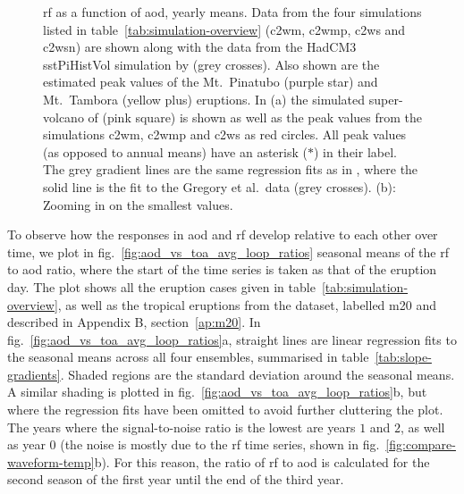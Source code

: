 \documentclass{ametsocV6.1}
\begin{document}
\begin{figure}
  \caption{\gls{rf} as a function of \gls{aod}, yearly means. Data from the four
    simulations listed in table~\ref{tab:simulation-overview} (\gls{c2wm}, \gls{c2wmp},
    \gls{c2ws} and \gls{c2wsn}) are shown along with the data from the HadCM3 sstPiHistVol
    simulation by \citet{gregory2016} (grey crosses). Also shown are the estimated peak
    values of the Mt.\ Pinatubo (purple star) and Mt.\ Tambora (yellow plus) eruptions. In
    (a) the simulated super-volcano of \citet{jones2005} (pink square) is shown as well as
    the peak values from the simulations \gls{c2wm}, \gls{c2wmp} and \gls{c2ws} as red
    circles. All peak values (as opposed to annual means) have an asterisk (\(\ast{}\)) in
    their label. The grey gradient lines are the same regression fits as in \citet[][Fig.\
      4]{gregory2016}, where the solid line is the fit to the Gregory et al.\ data (grey
    crosses). (b): Zooming in on the smallest values.}\label{fig:aod_vs_toa_ses_avg}%
\end{figure}

To observe how the responses in \gls{aod} and \gls{rf} develop relative to each other
over time, we plot in fig.~\ref{fig:aod_vs_toa_avg_loop_ratios} seasonal means of the
\gls{rf} to \gls{aod} ratio, where the start of the time series is taken as that of the
eruption day. The plot shows all the eruption cases given in
table~\ref{tab:simulation-overview}, as well as the tropical eruptions from the
\citet{marshall2020dataset} dataset, labelled \gls{m20} and described in Appendix B,
section~\ref{ap:m20}. In fig.~\ref{fig:aod_vs_toa_avg_loop_ratios}a, straight lines are
linear regression fits to the seasonal means across all four ensembles, summarised in
table~\ref{tab:slope-gradients}. Shaded regions are the standard deviation around the
seasonal means. A similar shading is plotted in
fig.~\ref{fig:aod_vs_toa_avg_loop_ratios}b, but where the regression fits have been
omitted to avoid further cluttering the plot. The years where the signal-to-noise ratio
is the lowest are years \(1\) and \(2\), as well as year \(0\) (the noise is mostly due
to the \gls{rf} time series, shown in fig.~\ref{fig:compare-waveform-temp}b). For this
reason, the ratio of \gls{rf} to \gls{aod} is calculated for the second season of the
first year until the end of the third year.
\end{document}
